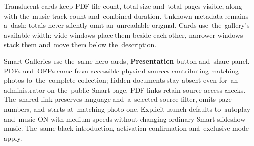 \documentclass[11pt,a4paper]{article}
\newcommand{\ui}[1]{\textbf{#1}}
\begin{document}
Translucent cards keep PDF file count, total size and~total pages visible,
along with the~music track count and~combined duration. Unknown metadata
remains a~dash; totals never silently omit an~unreadable original.
Cards use~the~gallery's available width: wide windows place them beside
each other, narrower windows stack them and~move them below the~description.

Smart Galleries use the~same hero cards, \ui{Presentation} button and~share
panel. PDFs and~OFPs come from accessible physical sources contributing matching
photos to~the~complete collection; hidden documents stay absent even for~an
administrator on~the~public Smart page. PDF links retain source access checks.
The~shared link preserves language and~a~selected source filter, omits page
numbers, and~starts at~matching photo one. Explicit launch defaults to~autoplay
and~music ON with medium speeds without changing ordinary Smart slideshow music.
The~same black introduction, activation confirmation and~exclusive mode apply.
\end{document}
